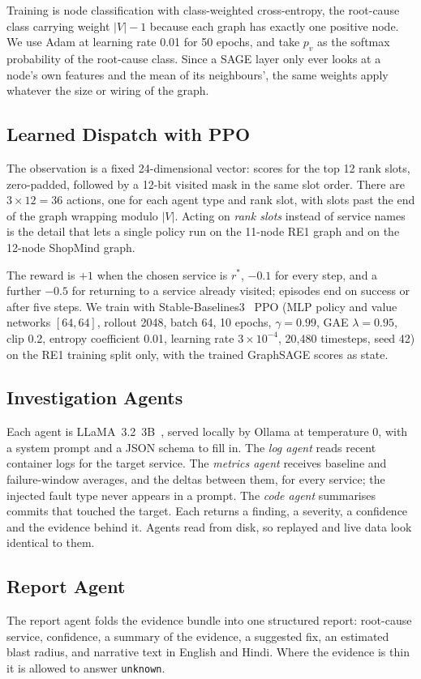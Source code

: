 \documentclass[conference,a4paper]{IEEEtran}
\begin{document}
Training is node classification with class-weighted cross-entropy, the root-cause class carrying weight $|V|-1$ because each graph has exactly one positive node. We use Adam at learning rate 0.01 for 50 epochs, and take $p_v$ as the softmax probability of the root-cause class. Since a SAGE layer only ever looks at a node's own features and the mean of its neighbours', the same weights apply whatever the size or wiring of the graph.

\subsection{Learned Dispatch with PPO}
The observation is a fixed 24-dimensional vector: scores for the top 12 rank slots, zero-padded, followed by a 12-bit visited mask in the same slot order. There are $3\times12=36$ actions, one for each agent type and rank slot, with slots past the end of the graph wrapping modulo $|V|$. Acting on \emph{rank slots} instead of service names is the detail that lets a single policy run on the 11-node RE1 graph and on the 12-node ShopMind graph.

The reward is $+1$ when the chosen service is $r^*$, $-0.1$ for every step, and a further $-0.5$ for returning to a service already visited; episodes end on success or after five steps. We train with Stable-Baselines3~\cite{raffin2021sb3} PPO (MLP policy and value networks $[64,64]$, rollout 2048, batch 64, 10 epochs, $\gamma=0.99$, GAE $\lambda=0.95$, clip 0.2, entropy coefficient 0.01, learning rate $3\times10^{-4}$, 20{,}480 timesteps, seed 42) on the RE1 training split only, with the trained GraphSAGE scores as state.

\subsection{Investigation Agents}
Each agent is LLaMA~3.2~3B~\cite{grattafiori2024llama3}, served locally by Ollama at temperature 0, with a system prompt and a JSON schema to fill in. The \emph{log agent} reads recent container logs for the target service. The \emph{metrics agent} receives baseline and failure-window averages, and the deltas between them, for every service; the injected fault type never appears in a prompt. The \emph{code agent} summarises commits that touched the target. Each returns a finding, a severity, a confidence and the evidence behind it. Agents read from disk, so replayed and live data look identical to them.

\subsection{Report Agent}
The report agent folds the evidence bundle into one structured report: root-cause service, confidence, a summary of the evidence, a suggested fix, an estimated blast radius, and narrative text in English and Hindi. Where the evidence is thin it is allowed to answer \texttt{unknown}.
\end{document}
